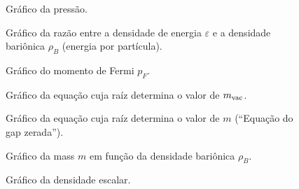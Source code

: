 \begin{enumerate}
\begin{figure}
	
	\caption{Gráfico da pressão. \protect}
	\label{Fig:pressure_NJL-Buballa_Set_1}
\end{figure}

\begin{figure}
	
	\caption{Gráfico da razão entre a densidade de energia $\varepsilon$ e a densidade bariônica $\rho_B$ (energia por partícula). \protect}
	\label{Fig:energy_density_per_particle_NJL-Buballa_Set_1}
\end{figure}

\FloatBarrier


\begin{figure}
	
	\caption{Gráfico do momento de Fermi $p_F$. \protect}
	\label{Fig:fermi_momentum_NJL-D_1}
\end{figure}

\begin{figure}
	
	\caption{Gráfico da equação cuja raíz determina o valor de $m_{\rm{vac}}$. \protect}
	\label{Fig:vacuum_mass_equation_NJL-D_1}
\end{figure}

\begin{figure}
	
	\caption{Gráfico da equação cuja raíz determina o valor de $m$ (``Equação do gap zerada''). \protect}
	\label{Fig:gap_NJL-D_1}
\end{figure}

\begin{figure}
	
	\caption{Gráfico da mass $m$ em função da densidade bariônica $\rho_B$. \protect}
	\label{Fig:mass_NJL-D_1}
\end{figure}


\begin{figure}
	
	\caption{Gráfico da densidade escalar. \protect}
	\label{Fig:scalar_density_NJL-D_1}
\end{figure}


\end{enumerate}
